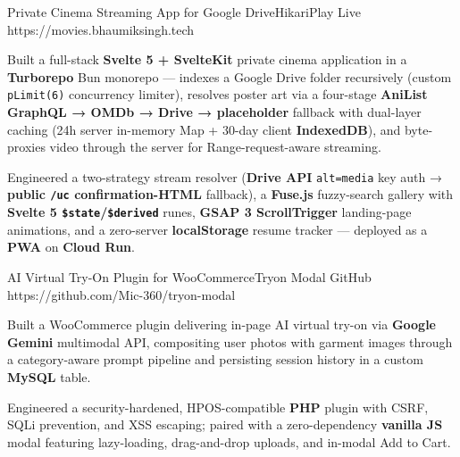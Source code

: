 \documentclass{bhaumic}
\begin{document}
\begin{samepage}
\projentry
  {Private Cinema Streaming App for Google Drive}{HikariPlay}
  {Live}
  {https://movies.bhaumiksingh.tech}
  {
    \begin{resbullets}
      \item Built a full-stack \textbf{Svelte 5 + SvelteKit} private cinema application in a \textbf{Turborepo} Bun monorepo — indexes a Google Drive folder recursively (custom \texttt{pLimit(6)} concurrency limiter), resolves poster art via a four-stage \textbf{AniList GraphQL → OMDb → Drive → placeholder} fallback with dual-layer caching (24h server in-memory Map + 30-day client \textbf{IndexedDB}), and byte-proxies video through the server for Range-request-aware streaming.
      \item Engineered a two-strategy stream resolver (\textbf{Drive API} \texttt{alt=media} key auth → \textbf{public \texttt{/uc} confirmation-HTML} fallback), a \textbf{Fuse.js} fuzzy-search gallery with \textbf{Svelte 5 \texttt{\$state}/\texttt{\$derived}} runes, \textbf{GSAP 3 ScrollTrigger} landing-page animations, and a zero-server \textbf{localStorage} resume tracker — deployed as a \textbf{PWA} on \textbf{Cloud Run}.
    \end{resbullets}
  }
\end{samepage}

\begin{samepage}
\projentry
  {AI Virtual Try-On Plugin for WooCommerce}{Tryon Modal}
  {GitHub}
  {https://github.com/Mic-360/tryon-modal}
  {
    \begin{resbullets}
      \item Built a WooCommerce plugin delivering in-page AI virtual try-on via \textbf{Google Gemini} multimodal API, compositing user photos with garment images through a category-aware prompt pipeline and persisting session history in a custom \textbf{MySQL} table.
      \item Engineered a security-hardened, HPOS-compatible \textbf{PHP} plugin with CSRF, SQLi prevention, and XSS escaping; paired with a zero-dependency \textbf{vanilla JS} modal featuring lazy-loading, drag-and-drop uploads, and in-modal Add to Cart.
    \end{resbullets}
  }
\end{samepage}


\end{document}
